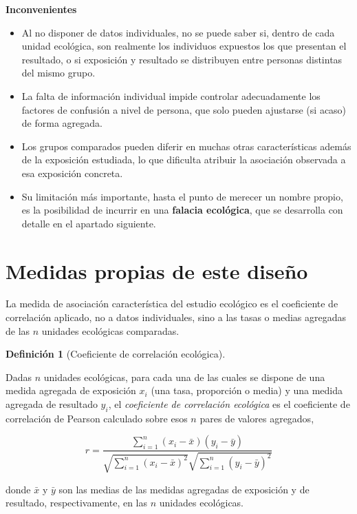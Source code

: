 \documentclass[
  spanish,
  a4paper,
]{scrreport}
\providecommand{\tightlist}{%
  \setlength{\itemsep}{0pt}\setlength{\parskip}{0pt}}
\theoremstyle{definition}
\theoremstyle{definition}
\newtheorem{definition}{Definición}[chapter]
\theoremstyle{remark}
\begin{document}
\textbf{Inconvenientes}

\begin{itemize}
\tightlist
\item
  Al no disponer de datos individuales, no se puede saber si, dentro de
  cada unidad ecológica, son realmente los individuos expuestos los que
  presentan el resultado, o si exposición y resultado se distribuyen
  entre personas distintas del mismo grupo.
\item
  La falta de información individual impide controlar adecuadamente los
  factores de confusión a nivel de persona, que solo pueden ajustarse
  (si acaso) de forma agregada.
\item
  Los grupos comparados pueden diferir en muchas otras características
  además de la exposición estudiada, lo que dificulta atribuir la
  asociación observada a esa exposición concreta.
\item
  Su limitación más importante, hasta el punto de merecer un nombre
  propio, es la posibilidad de incurrir en una \textbf{falacia
  ecológica}, que se desarrolla con detalle en el apartado siguiente.
\end{itemize}

\section{Medidas propias de este
diseño}\label{medidas-propias-de-este-diseuxf1o-4}

La medida de asociación característica del estudio ecológico es el
coeficiente de correlación aplicado, no a datos individuales, sino a las
tasas o medias agregadas de las \(n\) unidades ecológicas comparadas.

\begin{definition}[Coeficiente de correlación
ecológica]\protect\hypertarget{def-ecologicos-correlacion-agregada}{}\label{def-ecologicos-correlacion-agregada}

Dadas \(n\) unidades ecológicas, para cada una de las cuales se dispone
de una medida agregada de exposición \(x_i\) (una tasa, proporción o
media) y una medida agregada de resultado \(y_i\), el \emph{coeficiente
de correlación ecológica} es el coeficiente de correlación de Pearson
calculado sobre esos \(n\) pares de valores agregados,

\[r = \frac{\displaystyle\sum_{i=1}^n (x_i-\bar x)(y_i-\bar y)}{\sqrt{\displaystyle\sum_{i=1}^n (x_i-\bar x)^2}\sqrt{\displaystyle\sum_{i=1}^n (y_i-\bar y)^2}}\]

donde \(\bar x\) y \(\bar y\) son las medias de las medidas agregadas de
exposición y de resultado, respectivamente, en las \(n\) unidades
ecológicas.

\end{definition}
\end{document}

